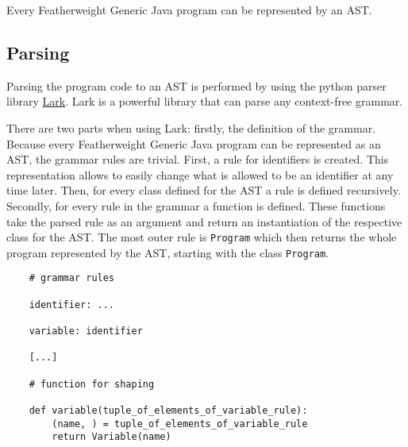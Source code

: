 Every Featherweight Generic Java program can be represented by an AST.

\subsection{Parsing}

Parsing the program code to an AST is performed by using the python parser library \href{https://lark-parser.readthedocs.io/en/stable/}{Lark}.
Lark is a powerful library that can parse any context-free grammar.

There are two parts when using Lark:
firstly, the definition of the grammar.
Because every Featherweight Generic Java program can be represented as an AST, the grammar rules are trivial.
First, a rule for identifiers is created. This representation allows to easily change what is allowed to be an identifier at any time later.
Then, for every class defined for the AST a rule is defined recursively.
Secondly, for every rule in the grammar a function is defined. These functions take the parsed rule as an argument and return an instantiation of the respective class for the AST.
The most outer rule is \verb|Program| which then returns the whole program represented by the AST, starting with the class \verb|Program|.

\begin{verbatim}
    # grammar rules

    identifier: ...

    variable: identifier

    [...]

    # function for shaping

    def variable(tuple_of_elements_of_variable_rule):
        (name, ) = tuple_of_elements_of_variable_rule
        return Variable(name)
\end{verbatim}
